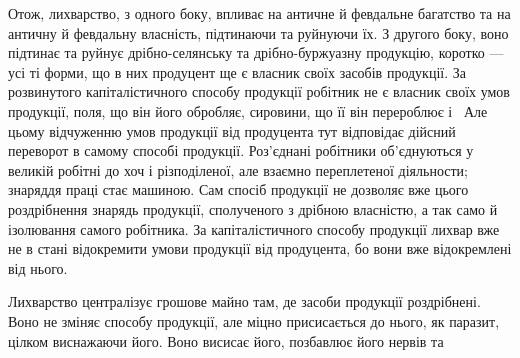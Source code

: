 Отож, лихварство, з одного боку, впливає на античне й февдальне багатство
та на античну й февдальну власність, підтинаючи та руйнуючи їх. З другого
боку, воно підтинає та руйнує дрібно-селянську та дрібно-буржуазну
продукцію, коротко — усі ті форми, що в них продуцент ще є власник своїх
засобів продукції. За розвинутого капіталістичного способу продукції робітник
не є власник своїх умов продукції, поля, що він його обробляє, сировини, що
її він перероблює і~ Але цьому відчуженню умов продукції від продуцента
тут відповідає дійсний переворот в самому способі продукції. Роз’єднані
робітники об’єднуються у великій робітні до хоч і різподіленої, але взаємно
переплетеної діяльности; знаряддя праці стає машиною. Сам спосіб продукції не
дозволяє вже цього роздрібнення знарядь продукції, сполученого з дрібною власністю,
а так само й ізолювання самого робітника. За капіталістичного способу
продукції лихвар вже не в стані відокремити умови продукції від продуцента, бо
вони вже відокремлені від нього.

Лихварство централізує грошове майно там, де засоби продукції роздрібнені.
Воно не зміняє способу продукції, але міцно присисається до нього, як
паразит, цілком виснажаючи його. Воно висисає його, позбавлює його нервів та
\parbreak{}  %
